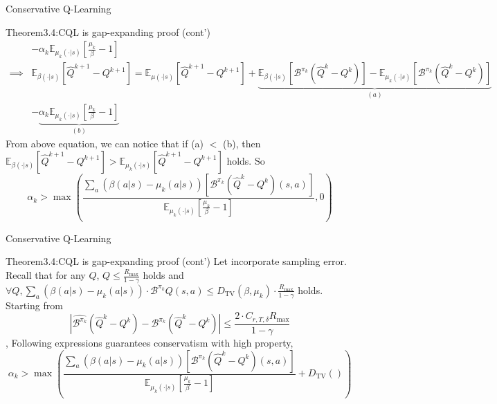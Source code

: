 \documentclass[11pt]{beamer}
\newcommand{\mbb}[1]{\mathbb{#1}}
\newcommand{\mc}[1]{\mathcal{#1}}
\newcommand{\abs}[1]{\left\lvert #1 \right\rvert}
\begin{document}
\begin{frame}{Conservative Q-Learning}
\begin{block}{Theorem3.4:CQL is gap-expanding proof (cont')}
\[\begin{aligned}
      &- \alpha_k \mbb{E}_{\mu_k(\cdot|s)}\left[\frac{\mu_k}{\beta} - 1 \right] \\
      \implies &\mbb{E}_{\beta(\cdot|s)}[\hat{Q}^{k+1} - Q^{k+1}] = \mbb{E}_{\mu(\cdot|s)}[\hat{Q}^{k+1} - Q^{k+1}] + \underbrace{\mbb{E}_{\beta(\cdot|s)}\left[\mc{B}^{\pi_k}\left(\hat{Q}^k -Q^k\right)\right] - \mbb{E}_{\mu_k(\cdot|s)}\left[\mc{B}^{\pi_k}\left(
        \hat{Q}^k- Q^k\right)\right]}_{(a)} \\
        &- \underbrace{\alpha_k \mbb{E}_{\mu_k(\cdot|s)}\left[\frac{\mu_k}{\beta} -1 \right]}_{(b)}
    \end{aligned}
    \]
    From above equation, we can notice that if (a) $<$ (b), then $\mbb{E}_{\beta(\cdot|s)}[\hat{Q}^{k+1} - Q^{k+1}] > \mbb{E}_{\mu_k(\cdot|s)}[\hat{Q}^{k+1} - Q^{k+1}]$ holds. So
    \[
      \alpha_k > \max \left(\frac{\sum_a (\beta(a|s)-\mu_k(a|s))\left[\mc{B}^{\pi_k} (\hat{Q}^k - Q^k)(s,a)\right]}{\mbb{E}_{\mu_k(\cdot|s)}[\frac{\mu_k}{\beta} -1]}, 0\right)
    \]
  \end{block}
\end{frame}

\begin{frame}{Conservative Q-Learning}
  \begin{block}{Theorem3.4:CQL is gap-expanding proof (cont')}
    Let incorporate sampling error.
    Recall that for any $Q$, $Q \leq \frac{R_{\text{max}}}{1- \gamma}$ holds and $\forall Q, \sum_a (\beta(a|s) - \mu_k(a|s)) \cdot \mc{B}^{\pi_k}Q(s,a) \leq D_{\text{TV}}(\beta, \mu_k)\cdot \frac{R_{\text{max}}}{1 - \gamma}$ holds.
    Starting from 
    \[
    \abs{\hat{\mc{B}^{\pi_k}}\left(\hat{Q}^k - Q^k\right) - \mc{B}^{\pi_k} \left(\hat{Q}^k -Q^k\right)} \leq \frac{2 \cdot C_{r,T,\delta}R_{\text{max}}}{1 - \gamma}
    \],
    Following expressions guarantees conservatism with high property,
    \[
      \alpha_k > \max \left(\frac{\sum_a (\beta(a|s)-\mu_k(a|s))\left[\mc{B}^{\pi_k} (\hat{Q}^k - Q^k)(s,a)\right]}{\mbb{E}_{\mu_k(\cdot|s)}[\frac{\mu_k}{\beta} -1]} + D_{\text{TV}}()\right)
    \]
  \end{block}
\end{frame}
\end{document}

